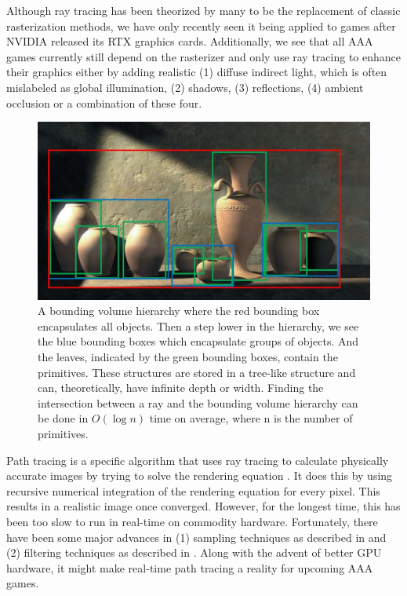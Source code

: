 Although ray tracing has been theorized by many to be the replacement of classic rasterization methods, we have only recently seen it being applied to games after NVIDIA released its RTX graphics cards. Additionally, we see that all AAA games currently still depend on the rasterizer and only use ray tracing to enhance their graphics either by adding realistic (1) diffuse indirect light, which is often mislabeled as global illumination, (2) shadows, (3) reflections, (4) ambient occlusion or a combination of these four\cite{NVIDIARTX}.
\begin{figure}[H]
    \centering
    \includegraphics[width=0.9\linewidth]{figures/bvh.jpg}
    \caption{A bounding volume hierarchy where the red bounding box encapsulates all objects. Then a step lower in the hierarchy, we see the blue bounding boxes which encapsulate groups of objects. And the leaves, indicated by the green bounding boxes, contain the primitives. These structures are stored in a tree-like structure and can, theoretically, have infinite depth or width. Finding the intersection between a ray and the bounding volume hierarchy can be done in $O(\log n)$ time on average, where n is the number of primitives. \cite{BVHJacco}}
    \label{fig:bvh}
\end{figure}

Path tracing is a specific algorithm that uses ray tracing to calculate physically accurate images by trying to solve the rendering equation \cite{kajiya1986rendering}. It does this by using recursive numerical integration of the rendering equation for every pixel. This results in a realistic image once converged. However, for the longest time, this has been too slow to run in real-time on commodity hardware. Fortunately, there have been some major advances in (1) sampling techniques as described in \cite{lin2022generalized} and (2) filtering techniques as described in \cite{yang2020survey}. Along with the advent of better GPU hardware, it might make real-time path tracing a reality for upcoming AAA games.

